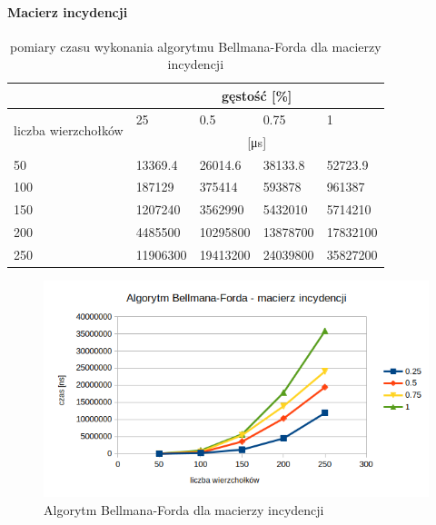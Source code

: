 \documentclass[11pt]{article}
\begin{document}
\paragraph{Macierz incydencji}

\begin{table}[H]
    \begin{tabular}{|l|llll|}
        \hline
                                             & \multicolumn{4}{c|}{gęstość {[}\%{]}}                                                                            \\ \hline
        \multirow{2}{*}{liczba wierzchołków} & \multicolumn{1}{l|}{25}               & \multicolumn{1}{l|}{0.5}      & \multicolumn{1}{l|}{0.75}     & 1        \\ \cline{2-5}
                                             & \multicolumn{4}{c|}{[μs]}                                                                                        \\ \hline
        50                                   & \multicolumn{1}{l|}{13369.4}          & \multicolumn{1}{l|}{26014.6}  & \multicolumn{1}{l|}{38133.8}  & 52723.9  \\ \hline
        100                                  & \multicolumn{1}{l|}{187129}           & \multicolumn{1}{l|}{375414}   & \multicolumn{1}{l|}{593878}   & 961387   \\ \hline
        150                                  & \multicolumn{1}{l|}{1207240}          & \multicolumn{1}{l|}{3562990}  & \multicolumn{1}{l|}{5432010}  & 5714210  \\ \hline
        200                                  & \multicolumn{1}{l|}{4485500}          & \multicolumn{1}{l|}{10295800} & \multicolumn{1}{l|}{13878700} & 17832100 \\ \hline
        250                                  & \multicolumn{1}{l|}{11906300}         & \multicolumn{1}{l|}{19413200} & \multicolumn{1}{l|}{24039800} & 35827200 \\ \hline
    \end{tabular}
    \caption{pomiary czasu wykonania algorytmu Bellmana-Forda dla   macierzy incydencji}
\end{table}

\begin{figure}[H]
    \includegraphics[width=13cm]{images/bellmanmacierz.png}
    \caption{ Algorytm Bellmana-Forda dla macierzy incydencji}
\end{figure}
\end{document}
